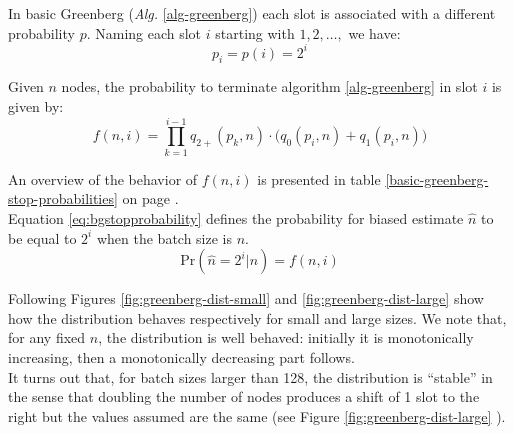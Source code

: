\documentclass[12pt,a4paper]{report}
\begin{document}
In basic Greenberg (\emph{Alg.} \ref{alg-greenberg}) each slot is associated with a different probability $p$. Naming each slot $i$ starting with $1, 2, \dots,$ we have:
\begin{equation}
	p_{i}=p(i)=2^{i}
\end{equation}

Given $n$ nodes, the probability to terminate algorithm \ref{alg-greenberg} in slot $i$ is given by:
\begin{equation}
f(n,i)=\prod_{k=1}^{i-1}q_{2+}(p_{k},n) \cdot \bigl( q_{0}(p_{i},n)+q_{1}(p_{i},n)\bigr)  
\label{eq:bgstopprobability}
\end{equation}

An overview of the behavior of $f(n,i)$ is presented in table \ref{basic-greenberg-stop-probabilities} on page \pageref{basic-greenberg-stop-probabilities}.\\ Equation \eqref{eq:bgstopprobability} defines the probability for biased estimate $\hat{n}$ to be equal to $2^{i}$ when the batch size is $n$. 
\begin{equation}
\textrm{Pr}\left( \hat{n}=2^{i}|n\right)=f(n,i)  
\end{equation}

Following Figures \ref{fig:greenberg-dist-small} and \ref{fig:greenberg-dist-large} show how the distribution behaves respectively for small and large sizes.
We note that, for any fixed $n$, the distribution is well behaved: initially it is monotonically increasing, then a monotonically decreasing part follows.\\
It turns out that, for batch sizes larger than 128, the distribution is ``stable'' in the sense that doubling the number of nodes produces a shift of 1 slot to the right but the values assumed are the same (see Figure \ref{fig:greenberg-dist-large} ).\\
\end{document}
